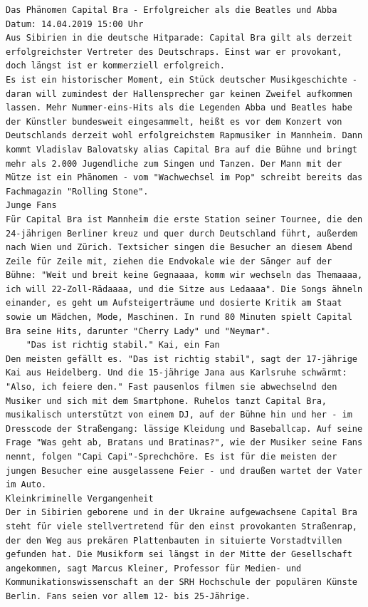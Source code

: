 \documentclass[
  letterpaper,
  DIV=11,
  numbers=noendperiod]{scrreprt}
\begin{document}
\begin{verbatim}
Das Phänomen Capital Bra - Erfolgreicher als die Beatles und Abba
Datum: 14.04.2019 15:00 Uhr
Aus Sibirien in die deutsche Hitparade: Capital Bra gilt als derzeit erfolgreichster Vertreter des Deutschraps. Einst war er provokant, doch längst ist er kommerziell erfolgreich.
Es ist ein historischer Moment, ein Stück deutscher Musikgeschichte - daran will zumindest der Hallensprecher gar keinen Zweifel aufkommen lassen. Mehr Nummer-eins-Hits als die Legenden Abba und Beatles habe der Künstler bundesweit eingesammelt, heißt es vor dem Konzert von Deutschlands derzeit wohl erfolgreichstem Rapmusiker in Mannheim. Dann kommt Vladislav Balovatsky alias Capital Bra auf die Bühne und bringt mehr als 2.000 Jugendliche zum Singen und Tanzen. Der Mann mit der Mütze ist ein Phänomen - vom "Wachwechsel im Pop" schreibt bereits das Fachmagazin "Rolling Stone".
Junge Fans
Für Capital Bra ist Mannheim die erste Station seiner Tournee, die den 24-jährigen Berliner kreuz und quer durch Deutschland führt, außerdem nach Wien und Zürich. Textsicher singen die Besucher an diesem Abend Zeile für Zeile mit, ziehen die Endvokale wie der Sänger auf der Bühne: "Weit und breit keine Gegnaaaa, komm wir wechseln das Themaaaa, ich will 22-Zoll-Rädaaaa, und die Sitze aus Ledaaaa". Die Songs ähneln einander, es geht um Aufsteigerträume und dosierte Kritik am Staat sowie um Mädchen, Mode, Maschinen. In rund 80 Minuten spielt Capital Bra seine Hits, darunter "Cherry Lady" und "Neymar".
    "Das ist richtig stabil." Kai, ein Fan
Den meisten gefällt es. "Das ist richtig stabil", sagt der 17-jährige Kai aus Heidelberg. Und die 15-jährige Jana aus Karlsruhe schwärmt: "Also, ich feiere den." Fast pausenlos filmen sie abwechselnd den Musiker und sich mit dem Smartphone. Ruhelos tanzt Capital Bra, musikalisch unterstützt von einem DJ, auf der Bühne hin und her - im Dresscode der Straßengang: lässige Kleidung und Baseballcap. Auf seine Frage "Was geht ab, Bratans und Bratinas?", wie der Musiker seine Fans nennt, folgen "Capi Capi"-Sprechchöre. Es ist für die meisten der jungen Besucher eine ausgelassene Feier - und draußen wartet der Vater im Auto.
Kleinkriminelle Vergangenheit
Der in Sibirien geborene und in der Ukraine aufgewachsene Capital Bra steht für viele stellvertretend für den einst provokanten Straßenrap, der den Weg aus prekären Plattenbauten in situierte Vorstadtvillen gefunden hat. Die Musikform sei längst in der Mitte der Gesellschaft angekommen, sagt Marcus Kleiner, Professor für Medien- und Kommunikationswissenschaft an der SRH Hochschule der populären Künste Berlin. Fans seien vor allem 12- bis 25-Jährige.

\end{verbatim}
\end{document}
